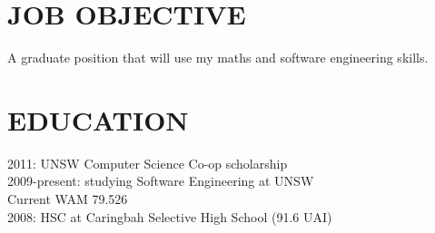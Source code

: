 \documentclass{res}
\begin{document}
 


\address{16A Old Forest Rd \\  Lugarno, NSW 2210
         \\  grasevski@gmail.com
         \\  0405 634 067}
                                  
\begin{resume}

\section{JOB OBJECTIVE}          
    A graduate position that will use my maths and software engineering skills.
 
\section{EDUCATION}          
    2011: UNSW Computer Science Co-op scholarship \\
    2009-present: studying Software Engineering at UNSW \\
    Current WAM 79.526 \\
    2008: HSC at Caringbah Selective High School (91.6 UAI)

 

\end{resume}
\end{document}
